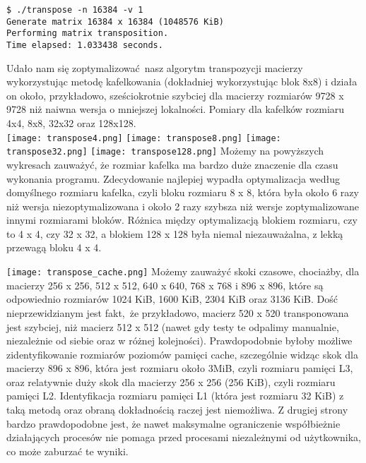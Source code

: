 \documentclass[10pt,wide]{mwart}
\begin{document}
\texttt{\$ ./transpose -n 16384 -v 1 \\
Generate matrix 16384 x 16384 (1048576 KiB) \\
Performing matrix transposition. \\
Time elapsed: 1.033438 seconds.\\}

 Udało nam się zoptymalizować nasz algorytm transpozycji macierzy wykorzystując metodę kafelkowania (dokładniej wykorzystując blok 8x8) i działa on około, przykładowo, sześciokrotnie szybciej dla macierzy rozmiarów 9728 x 9728 niż naiwna wersja o mniejszej lokalności.
 Pomiary dla kafelków rozmiaru 4x4, 8x8, 32x32 oraz 128x128.\\
 \texttt{[image: transpose4.png]}
 \texttt{[image: transpose8.png]}
 \texttt{[image: transpose32.png]}
 \texttt{[image: transpose128.png]}
 Możemy na powyższych wykresach zauważyć, że rozmiar kafelka ma bardzo duże znaczenie dla czasu wykonania programu.
 Zdecydowanie najlepiej wypadła optymalizacja według domyślnego rozmiaru kafelka,
 czyli bloku rozmiaru 8 x 8, która była około 6 razy niż wersja niezoptymalizowana i około 2 razy szybsza niż wersje zoptymalizowane innymi rozmiarami bloków.
 Różnica między optymalizacją blokiem rozmiaru, czy to 4 x 4, czy 32 x 32, a blokiem 128 x 128 była niemal niezauważalna, z lekką przewagą bloku 4 x 4.

 \texttt{[image: transpose\_cache.png]}
 Możemy zauważyć skoki czasowe, chociażby, dla macierzy 256 x 256, 512 x 512, 640 x 640, 768 x 768 i 896 x 896, które są odpowiednio rozmiarów 1024 KiB, 1600 KiB, 2304 KiB oraz 3136 KiB.
 Dość nieprzewidzianym jest fakt, że przykładowo, macierz 520 x 520 transponowana jest szybciej, niż macierz 512 x 512 (nawet gdy testy te odpalimy manualnie, niezależnie od siebie oraz w różnej kolejności).
 Prawdopodobnie byłoby możliwe zidentyfikowanie rozmiarów poziomów pamięci cache, szczególnie widząc skok dla macierzy 896 x 896, która jest rozmiaru około 3MiB, czyli rozmiaru pamięci L3, oraz relatywnie duży skok dla macierzy 256 x 256 (256 KiB), czyli rozmiaru pamięci L2.
 Identyfikacja rozmiaru pamięci L1 (która jest rozmiaru 32 KiB) z taką metodą oraz obraną dokładnością raczej jest niemożliwa.
 Z drugiej strony bardzo prawdopodobne jest, że nawet maksymalne ograniczenie współbieżnie działających procesów nie pomaga przed procesami niezależnymi od użytkownika, co może zaburzać te wyniki.
\end{document}
